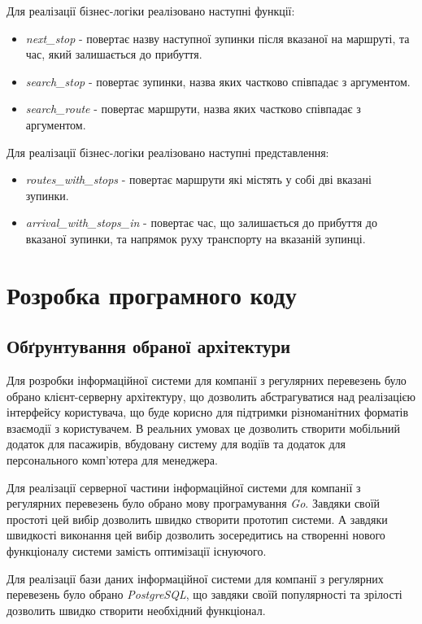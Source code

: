 \documentclass[oneside,14pt]{extarticle}
\begin{document}
Для реалізації бізнес-логіки реалізовано наступні функції:
\begin{itemize}
\item \textit{next\_stop} - повертає назву наступної зупинки після вказаної на маршруті, та час, який залишається до прибуття.
\item \textit{search\_stop} - повертає зупинки, назва яких частково співпадає з аргументом.
\item \textit{search\_route} - повертає маршрути, назва яких частково співпадає з аргументом.
\end{itemize}

Для реалізації бізнес-логіки реалізовано наступні представлення:
\begin{itemize}
\item \textit{routes\_with\_stops} - повертає маршрути які містять у собі дві вказані зупинки.
\item \textit{arrival\_with\_stops\_in} - повертає час, що залишається до прибуття до вказаної зупинки, та напрямок руху транспорту на вказаній зупинці.
\end{itemize}

\newpage

\section{Розробка програмного коду}
\subsection{Обґрунтування обраної архітектури}
Для розробки інформаційної системи для компанії з регулярних перевезень було обрано клієнт-серверну архітектуру, що дозволить абстрагуватися над реалізацією інтерфейсу користувача, що буде корисно для підтримки різноманітних форматів взаємодії з користувачем. В реальних умовах це дозволить створити мобільний додаток для пасажирів, вбудовану систему для водіїв та додаток для персонального комп'ютера для менеджера.

Для реалізації серверної частини інформаційної системи для компанії з регулярних перевезень було обрано мову програмування \textit{Go}. Завдяки своїй простоті цей вибір дозволить швидко створити прототип системи. А завдяки швидкості виконання цей вибір дозволить зосередитись на створенні нового функціоналу системи замість оптимізації існуючого.

Для реалізації бази даних інформаційної системи для компанії з регулярних перевезень було обрано \textit{PostgreSQL}, що завдяки своїй популярності та зрілості дозволить швидко створити необхідний функціонал.
\end{document}
